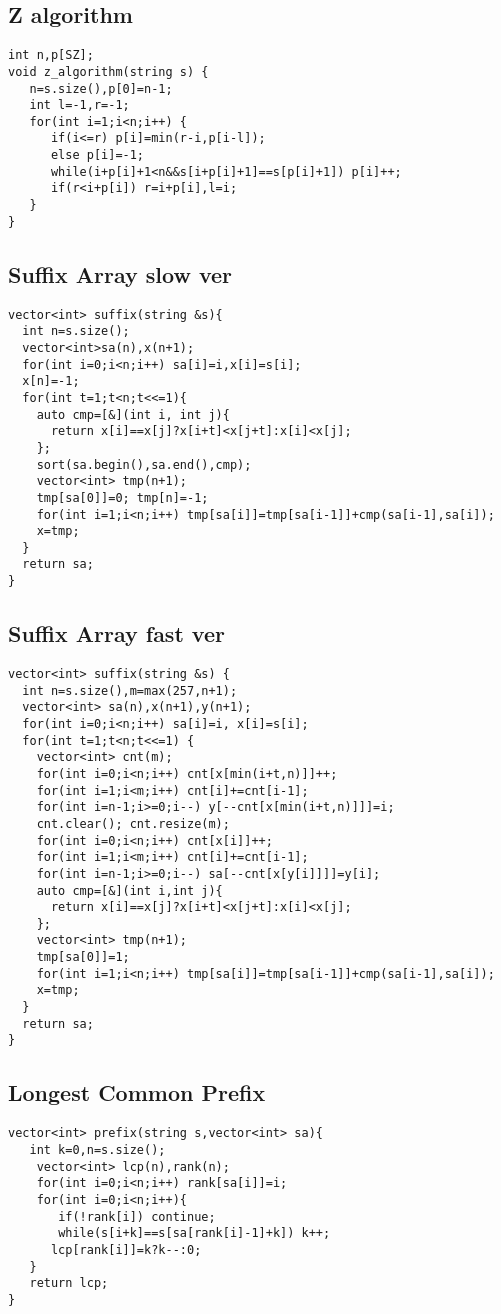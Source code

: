 \documentclass[landscape, 8pt, a4paper, oneside, twocolumn]{extarticle}
\begin{document}
\subsection{Z algorithm}
\begin{verbatim}
int n,p[SZ];
void z_algorithm(string s) {
   n=s.size(),p[0]=n-1;
   int l=-1,r=-1;
   for(int i=1;i<n;i++) {
      if(i<=r) p[i]=min(r-i,p[i-l]);
      else p[i]=-1;
      while(i+p[i]+1<n&&s[i+p[i]+1]==s[p[i]+1]) p[i]++;
      if(r<i+p[i]) r=i+p[i],l=i;
   }
}
\end{verbatim}

\subsection{Suffix Array slow ver}
\begin{verbatim}
vector<int> suffix(string &s){
  int n=s.size();
  vector<int>sa(n),x(n+1);
  for(int i=0;i<n;i++) sa[i]=i,x[i]=s[i];
  x[n]=-1;
  for(int t=1;t<n;t<<=1){
    auto cmp=[&](int i, int j){
      return x[i]==x[j]?x[i+t]<x[j+t]:x[i]<x[j];
    };
    sort(sa.begin(),sa.end(),cmp);
    vector<int> tmp(n+1);
    tmp[sa[0]]=0; tmp[n]=-1;
    for(int i=1;i<n;i++) tmp[sa[i]]=tmp[sa[i-1]]+cmp(sa[i-1],sa[i]);
    x=tmp;
  }
  return sa;
}
\end{verbatim}

\subsection{Suffix Array fast ver}
\begin{verbatim}
vector<int> suffix(string &s) {
  int n=s.size(),m=max(257,n+1);
  vector<int> sa(n),x(n+1),y(n+1);
  for(int i=0;i<n;i++) sa[i]=i, x[i]=s[i];
  for(int t=1;t<n;t<<=1) {
    vector<int> cnt(m);
    for(int i=0;i<n;i++) cnt[x[min(i+t,n)]]++;
    for(int i=1;i<m;i++) cnt[i]+=cnt[i-1];
    for(int i=n-1;i>=0;i--) y[--cnt[x[min(i+t,n)]]]=i;
    cnt.clear(); cnt.resize(m);
    for(int i=0;i<n;i++) cnt[x[i]]++;
    for(int i=1;i<m;i++) cnt[i]+=cnt[i-1];
    for(int i=n-1;i>=0;i--) sa[--cnt[x[y[i]]]]=y[i];
    auto cmp=[&](int i,int j){
      return x[i]==x[j]?x[i+t]<x[j+t]:x[i]<x[j];
    };
    vector<int> tmp(n+1);
    tmp[sa[0]]=1;
    for(int i=1;i<n;i++) tmp[sa[i]]=tmp[sa[i-1]]+cmp(sa[i-1],sa[i]);
    x=tmp;
  }
  return sa;
}
\end{verbatim}

\subsection{Longest Common Prefix}
\begin{verbatim}
vector<int> prefix(string s,vector<int> sa){
   int k=0,n=s.size();
    vector<int> lcp(n),rank(n);
    for(int i=0;i<n;i++) rank[sa[i]]=i;
    for(int i=0;i<n;i++){
       if(!rank[i]) continue;
       while(s[i+k]==s[sa[rank[i]-1]+k]) k++;
      lcp[rank[i]]=k?k--:0;
   }
   return lcp;
}
\end{verbatim}
\end{document}
